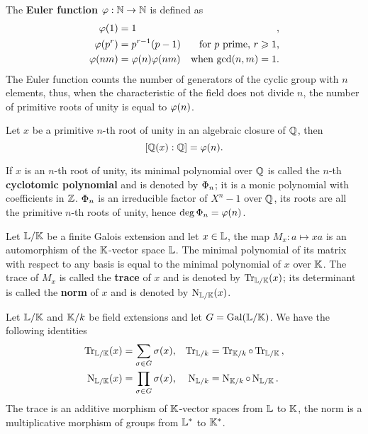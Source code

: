 The \textbf{Euler function} $\varphi:\mathbb{N}\rightarrow\mathbb{N}$ is
defined as
\begin{align*}
  \varphi(1) &= 1 &\text{,}\\
  \varphi(p^r) &= p^{r-1}(p-1) &\text{for $p$ prime, $r\geqslant1$,}\\
  \varphi(nm) &= \varphi(n)\varphi(nm) &\text{when $\gcd(n,m)=1$.}
\end{align*}
The Euler function counts the number of generators of the cyclic group
with $n$ elements, thus, when the characteristic of the field does not
divide $n$, the number of primitive roots of unity is equal to $\varphi(n)$.

\begin{theorem}
  Let $x$ be a primitive $n$-th root of unity in an algebraic closure
  of $\mathbb{Q}$, then
  \[[\mathbb{Q}(x):\mathbb{Q}]=\varphi(n)\text{.}\]
\end{theorem}

If $x$ is an $n$-th root of unity, its minimal polynomial over $\mathbb{Q}$ is
called the $n$-th \textbf{cyclotomic
  polynomial} and is denoted by $\Phi_n$; it is a monic polynomial
with coefficients in $\mathbb{Z}$. $\Phi_n$ is an irreducible factor of
$X^n-1$ over $\mathbb{Q}$, its roots are all the primitive $n$-th roots of
unity, hence $\deg\Phi_n=\varphi(n)$.

Let $\mathbb{L}/\mathbb{K}$ be a finite Galois extension and let $x\in\mathbb{L}$, the map
$M_x:a\mapsto xa$ is an automorphism of the $\mathbb{K}$-vector space
$\mathbb{L}$. The minimal polynomial of its matrix with respect to any basis
is equal to the minimal polynomial of $x$ over $\mathbb{K}$.  The trace of
$M_x$ is called the \textbf{trace} of $x$
and is denoted by $\operatorname{Tr}_{\mathbb{L}/\mathbb{K}}(x)$; its determinant is called the
\textbf{norm} of $x$ and is denoted by
$\operatorname{N}_{\mathbb{L}/\mathbb{K}}(x)$.

\begin{proposition}
  \label{th:basic-galois-theory:trace}
  Let $\mathbb{L}/\mathbb{K}$ and $\mathbb{K}/k$ be field extensions and let
  $G=\operatorname{Gal}(\mathbb{L}/\mathbb{K})$. We have the following identities
  \begin{align*}
    \operatorname{Tr}_{\mathbb{L}/\mathbb{K}}(x) &= \sum_{\sigma\in G}\sigma(x) \text{,}&
    \operatorname{Tr}_{\mathbb{L}/k} &= \operatorname{Tr}_{\mathbb{K}/k}\circ\operatorname{Tr}_{\mathbb{L}/\mathbb{K}}\text{,}\\
    \operatorname{N}_{\mathbb{L}/\mathbb{K}}(x) &= \prod_{\sigma\in G}\sigma(x) \text{,}&
    \operatorname{N}_{\mathbb{L}/k} &= \operatorname{N}_{\mathbb{K}/k}\circ\operatorname{N}_{\mathbb{L}/\mathbb{K}}\text{.}
  \end{align*}
  The trace is an additive morphism of $\mathbb{K}$-vector spaces from $\mathbb{L}$
  to $\mathbb{K}$, the norm is a multiplicative morphism of groups from
  $\mathbb{L}^\ast$ to $\mathbb{K}^\ast$.
\end{proposition}


